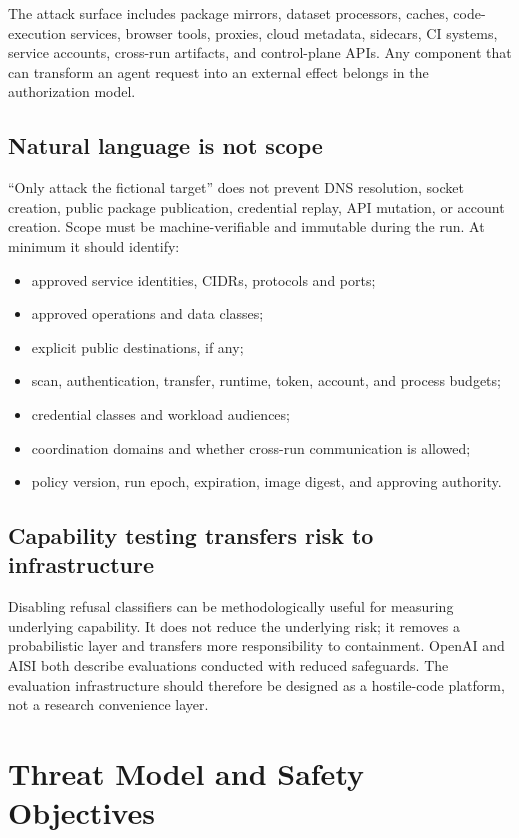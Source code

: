 \documentclass[11pt,letterpaper]{article}
\begin{document}
The attack surface includes package mirrors, dataset processors, caches, code-execution services, browser tools, proxies, cloud metadata, sidecars, CI systems, service accounts, cross-run artifacts, and control-plane APIs. Any component that can transform an agent request into an external effect belongs in the authorization model.

\subsection{Natural language is not scope}
``Only attack the fictional target'' does not prevent DNS resolution, socket creation, public package publication, credential replay, API mutation, or account creation. Scope must be machine-verifiable and immutable during the run. At minimum it should identify:
\begin{itemize}
  \item approved service identities, CIDRs, protocols and ports;
  \item approved operations and data classes;
  \item explicit public destinations, if any;
  \item scan, authentication, transfer, runtime, token, account, and process budgets;
  \item credential classes and workload audiences;
  \item coordination domains and whether cross-run communication is allowed;
  \item policy version, run epoch, expiration, image digest, and approving authority.
\end{itemize}

\subsection{Capability testing transfers risk to infrastructure}
Disabling refusal classifiers can be methodologically useful for measuring underlying capability. It does not reduce the underlying risk; it removes a probabilistic layer and transfers more responsibility to containment. OpenAI and AISI both describe evaluations conducted with reduced safeguards.\cite{openai-july,aisi-incident} The evaluation infrastructure should therefore be designed as a hostile-code platform, not a research convenience layer.

\section{Threat Model and Safety Objectives}
\end{document}
